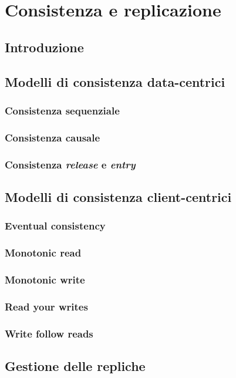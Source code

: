 \section{Consistenza e replicazione}\label{capitolo9}
\subsection{Introduzione}
\subsection{Modelli di consistenza data-centrici}
\subsubsection{Consistenza sequenziale}
\subsubsection{Consistenza causale}
\subsubsection{Consistenza \emph{release} e \emph{entry}}
\subsection{Modelli di consistenza client-centrici}
\subsubsection{Eventual consistency}
\subsubsection{Monotonic read}
\subsubsection{Monotonic write}
\subsubsection{Read your writes}
\subsubsection{Write follow reads}
\subsection{Gestione delle repliche}
